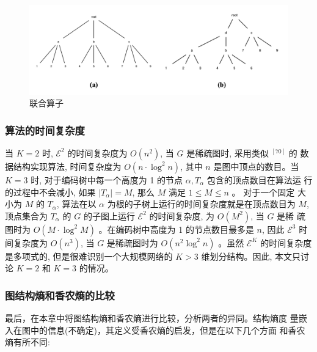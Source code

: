 \documentclass[a4paper]{apa6}
\begin{document}
\begin{enumerate}
\begin{figure}[htbp]
\centering
\includegraphics[width=.9\linewidth]{./asset/combining-operator.png}
\caption{\label{fig:combining-operator}联合算子}
\end{figure}
\end{enumerate}

\subsubsection{算法的时间复杂度}
\label{sec:org11f0fa5}
当 \(K=2\) 时, \(\mathcal{E}^{2}\) 的时间复杂度为 \(O\left(n^{2}\right)\), 当 \(G\) 是稀疏图时, 采用类似 \({ }^{[70]}\) 的 数据结构实现算法, 时间复杂度为 \(O\left(n \cdot \log ^{2} n\right)\), 其中 \(n\) 是图中顶点的数目。当 \(K=3\) 时, 对于编码树中每一个高度为 1 的节点 \(\alpha, T_{\alpha}\) 包含的顶点数目在算法运 行的过程中不会减小, 如果 \(\left|T_{\alpha}\right|=M\), 那么 \(M\) 满足 \(1 \leq M \leq n\) 。 对于一个固定 大小为 \(M\) 的 \(T_{\alpha}\), 算法在以 \(\alpha\) 为根的子树上运行的时间复杂度就是在顶点数目为 \(M\), 顶点集合为 \(T_{\alpha}\) 的 \(G\) 的子图上运行 \(\mathcal{E}^{2}\) 的时间复杂度, 为 \(O\left(M^{2}\right)\), 当 \(G\) 是稀 疏图时为 \(O\left(M \cdot \log ^{2} M\right)\) 。在编码树中高度为 1 的节点数目最多是 \(n\), 因此 \(\mathcal{E}^{3}\) 时 间复杂度为 \(O\left(n^{3}\right)\), 当 \(G\) 是稀疏图时为 \(O\left(n^{2} \log ^{2} n\right)\) 。虽然 \(\mathcal{E}^{K}\) 的时间复杂度是多项式的, 但是很难识别一个大规模网络的 \(K>3\) 维划分结构。因此, 本文只讨论 \(K=2\) 和 \(K=3\) 的情况。

\subsubsection{图结构熵和香农熵的比较}
\label{sec:orge21f1e2}
最后，在本章中将图结构熵和香农熵进行比较，分析两者的异同。结构熵度 量嵌入在图中的信息(不确定)，其定义受香农熵的启发，但是在以下几个方面 和香农熵有所不同:
\end{document}
